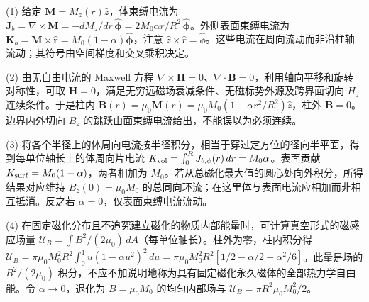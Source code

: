 (1) 给定 \(\mathbf M=M_z(r)\hat z\)，体束缚电流为 \(\mathbf J_b=\nabla\times\mathbf M=-dM_z/dr\,\hat{\boldsymbol{\phi}}=2M_0\alpha r/R^2\,\hat{\boldsymbol{\phi}}\)。外侧表面束缚电流为 \(\mathbf K_b=\mathbf M\times\hat{\mathbf r}=M_0(1-\alpha)\hat{\boldsymbol{\phi}}\)，注意 \(\hat z\times\hat r=\hat\phi\)。这些电流在周向流动而非沿柱轴流动；其符号由空间梯度和交叉乘积决定。

(2) 由无自由电流的 Maxwell 方程 \(\nabla\times\mathbf H=0\)、\(\nabla\cdot\mathbf B=0\)，利用轴向平移和旋转对称性，可取 \(\mathbf H=0\)，满足无穷远磁场衰减条件、无磁标势外源及跨界面切向 \(H_z\) 连续条件。于是柱内 \(\mathbf B(r)=\mu_0\mathbf M(r)=\mu_0M_0(1-\alpha r^2/R^2)\hat z\)，柱外 \(\mathbf B=0\)。边界内外切向 \(B_z\) 的跳跃由面束缚电流给出，不能误以为必须连续。

(3) 将各个半径上的体周向电流按半径积分，相当于穿过定方位的径向半平面，得到每单位轴长上的体周向片电流 \(K_{\rm vol}=\int_0^R J_{b,\phi}(r)\,dr=M_0\alpha\)。表面贡献 \(K_{\rm surf}=M_0(1-\alpha)\)，两者相加为 \(M_0\)。若从总磁化最大值的圆心处向外积分，所得结果对应维持 \(B_z(0)=\mu_0M_0\) 的总同向环流；在这里体与表面电流应相加而非相互抵消。反之若 \(\alpha=0\)，仅表面束缚电流流动。

(4) 在固定磁化分布且不追究建立磁化的物质内部能量时，可计算真空形式的磁感应场量 \(\mathcal U_B=\int B^2/(2\mu_0)\,dA\)（每单位轴长）。柱外为零，柱内积分得 \(\mathcal U_B=\pi\mu_0M_0^2R^2\int_0^1u(1-\alpha u^2)^2\,du=\pi\mu_0M_0^2R^2[1/2-\alpha/2+\alpha^2/6]\)。此量是场的 \(B^2/(2\mu_0)\) 积分，不应不加说明地称为具有固定磁化永久磁体的全部热力学自由能。令 \(\alpha\to0\)，退化为 \(B=\mu_0M_0\) 的均匀内部场与 \(\mathcal U_B=\pi R^2\mu_0M_0^2/2\)。
